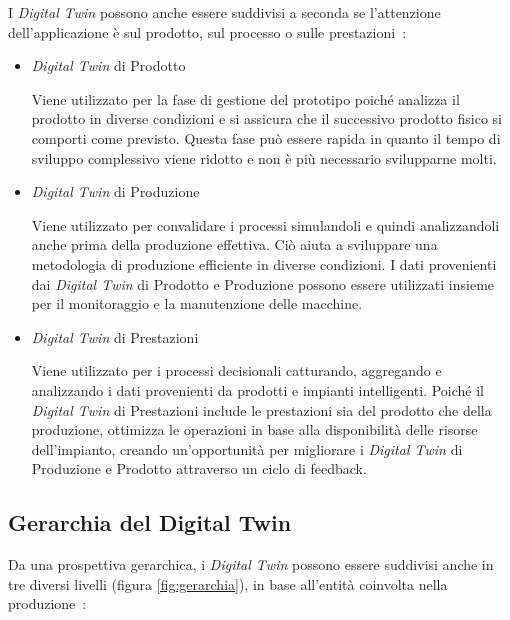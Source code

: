 I \emph{Digital Twin} possono anche essere suddivisi a seconda se l'attenzione dell'applicazione è sul prodotto, sul processo o sulle prestazioni~\cite{Categoria}:
\begin{itemize}
    \item \emph{Digital Twin} di Prodotto
    
    Viene utilizzato per la fase di gestione del prototipo poiché analizza il prodotto in diverse condizioni e si assicura che il successivo prodotto fisico si comporti come previsto. Questa fase può essere rapida in quanto il tempo di sviluppo complessivo viene ridotto e non è più necessario svilupparne molti.

    \item \emph{Digital Twin} di Produzione
    
    Viene utilizzato per convalidare i processi simulandoli e quindi analizzandoli anche prima della produzione effettiva. Ciò aiuta a sviluppare una metodologia di produzione efficiente in diverse condizioni. I dati provenienti dai \emph{Digital Twin} di Prodotto e Produzione possono essere utilizzati insieme per il monitoraggio e la manutenzione delle macchine.
    
    \item \emph{Digital Twin} di Prestazioni
    
    Viene utilizzato per i processi decisionali catturando, aggregando e analizzando i dati provenienti da prodotti e impianti intelligenti. Poiché il \emph{Digital Twin} di Prestazioni include le prestazioni sia del prodotto che della produzione, ottimizza le operazioni in base alla disponibilità delle risorse dell'impianto, creando un'opportunità per migliorare i \emph{Digital Twin} di Produzione e Prodotto attraverso un ciclo di feedback.
\end{itemize}

\newpage

\subsection{Gerarchia del Digital Twin}

Da una prospettiva gerarchica, i \emph{Digital Twin} possono essere suddivisi anche in tre diversi livelli (figura \ref{fig:gerarchia}), in base all'entità coinvolta nella produzione~\cite{Identificabile}:


